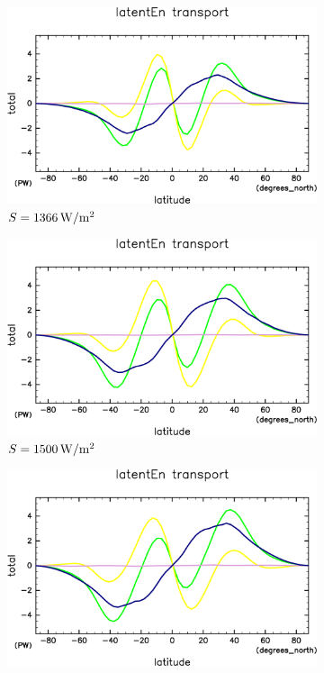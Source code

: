 \documentclass[body]{subfiles}
\begin{document}
\begin{figure}[t]
	\centering
	\begin{subfigure}{.4\textwidth}
		\centering
		\includegraphics[width=\columnwidth]{S1366/MeriHeatTrans@latentEn,time=14600:14965-crop-rotate.pdf}
		\caption{\(S=1366\hmu{W/m^2}\)}
	\end{subfigure}
	\begin{subfigure}{.4\textwidth}
		\centering
		\includegraphics[width=\columnwidth]{S1500/MeriHeatTrans@latentEn,time=3650:4015-crop-rotate.pdf}
		\caption{\(S=1500\hmu{W/m^2}\)}
	\end{subfigure}
	\begin{subfigure}{.4\textwidth}
		\centering
		\includegraphics[width=\columnwidth]{S1600/MeriHeatTrans@latentEn,time=3650:4015-crop-rotate.pdf}

\end{subfigure}
\end{figure}
\end{document}
